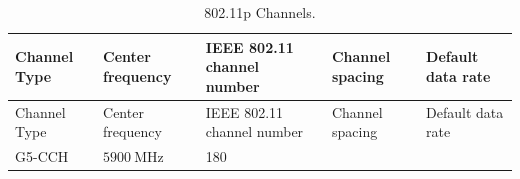 \documentclass[letterpaper,11pt,ngerman]{article}
\begin{document}
\begin{onehalfspace}
\begin{longtable}[]{@{}lllll@{}}
\caption{802.11p Channels.}\label{tbl:channels}\tabularnewline
\toprule
\begin{minipage}[b]{0.08\columnwidth}\raggedright\strut
Channel Type\strut
\end{minipage} & \begin{minipage}[b]{0.30\columnwidth}\raggedright\strut
Center frequency\strut
\end{minipage} & \begin{minipage}[b]{0.16\columnwidth}\raggedright\strut
IEEE 802.11 channel number\strut
\end{minipage} & \begin{minipage}[b]{0.14\columnwidth}\raggedright\strut
Channel spacing\strut
\end{minipage} & \begin{minipage}[b]{0.18\columnwidth}\raggedright\strut
Default data rate\strut
\end{minipage}\tabularnewline
\midrule
\endfirsthead
\toprule
\begin{minipage}[b]{0.08\columnwidth}\raggedright\strut
Channel Type\strut
\end{minipage} & \begin{minipage}[b]{0.30\columnwidth}\raggedright\strut
Center frequency\strut
\end{minipage} & \begin{minipage}[b]{0.16\columnwidth}\raggedright\strut
IEEE 802.11 channel number\strut
\end{minipage} & \begin{minipage}[b]{0.14\columnwidth}\raggedright\strut
Channel spacing\strut
\end{minipage} & \begin{minipage}[b]{0.18\columnwidth}\raggedright\strut
Default data rate\strut
\end{minipage}\tabularnewline
\midrule
\endhead
\begin{minipage}[t]{0.08\columnwidth}\raggedright\strut
G5-CCH\strut
\end{minipage} & \begin{minipage}[t]{0.30\columnwidth}\raggedright\strut
\(\SI{5900}{\mega\hertz}\)\strut
\end{minipage} & \begin{minipage}[t]{0.16\columnwidth}\raggedright\strut
180\strut
\end{minipage} & \begin{minipage}[t]{0.14\columnwidth}\raggedright\strut

\end{minipage}
\end{longtable}
\end{onehalfspace}
\end{document}

